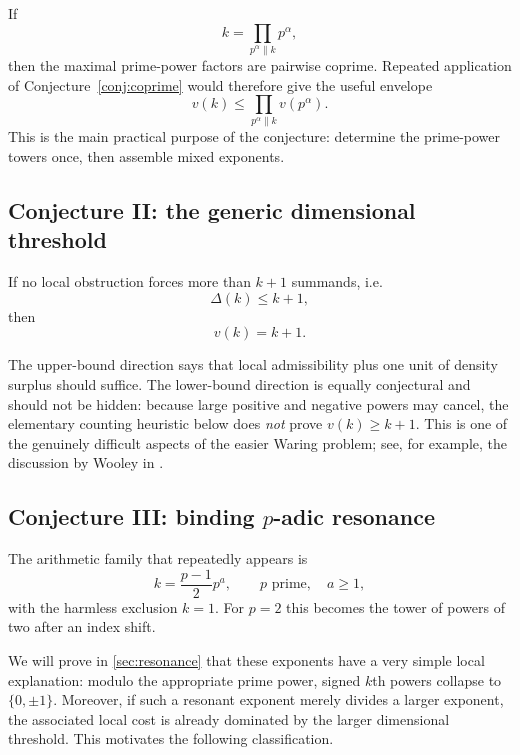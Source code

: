 \documentclass[../../Axiomathic.tex]{subfiles}
\begin{document}
If
\[
  k=\prod_{p^\alpha\parallel k}p^\alpha,
\]
then the maximal prime-power factors are pairwise coprime.  Repeated application of Conjecture~\ref{conj:coprime} would therefore give the useful envelope
\begin{equation}\label{eq:prime-power-envelope}
  \boxed{v(k)\le\prod_{p^\alpha\parallel k}v(p^\alpha).}
\end{equation}
This is the main practical purpose of the conjecture: determine the prime-power towers once, then assemble mixed exponents.

\subsection{Conjecture II: the generic dimensional threshold}

\begin{conj}\label{conj:generic}
If no local obstruction forces more than $k+1$ summands, i.e.
\[
  \Delta(k)\le k+1,
\]
then
\begin{equation}\label{eq:generic-v}
  \boxed{v(k)=k+1.}
\end{equation}
\end{conj}

The upper-bound direction says that local admissibility plus one unit of density surplus should suffice.  The lower-bound direction is equally conjectural and should not be hidden: because large positive and negative powers may cancel, the elementary counting heuristic below does \emph{not} prove $v(k)\ge k+1$.  This is one of the genuinely difficult aspects of the easier Waring problem; see, for example, the discussion by Wooley in \cite{BukhMO}.

\subsection{Conjecture III: binding $p$-adic resonance}

The arithmetic family that repeatedly appears is
\begin{equation}\label{eq:resonance-family}
  k=\frac{p-1}{2}p^a,
  \qquad p\text{ prime},\quad a\ge1,
\end{equation}
with the harmless exclusion $k=1$.  For $p=2$ this becomes the tower of powers of two after an index shift.

We will prove in \cref{sec:resonance} that these exponents have a very simple local explanation: modulo the appropriate prime power, signed $k$th powers collapse to $\{0,\pm1\}$.  Moreover, if such a resonant exponent merely divides a larger exponent, the associated local cost is already dominated by the larger dimensional threshold.  This motivates the following classification.
\end{document}
